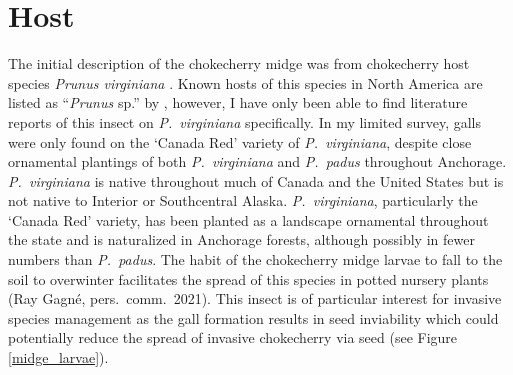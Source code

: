 \section{Host}
 The initial description of the chokecherry midge was from chokecherry host species \textit{Prunus virginiana} \citep{Felt1906}. Known hosts of this species in North America are listed as ``\textit{Prunus} sp.'' by \citet{GagneJaschhof2021}, however, I have only been able to find literature reports of this insect on \textit{P.\ virginiana} specifically. In my limited survey, galls were only found on the `Canada Red' variety of \textit{P.\ virginiana}, despite close ornamental plantings of both \textit{P.\ virginiana} and \textit{P.\ padus} throughout Anchorage. \textit{P.\ virginiana} is native throughout much of Canada and the United States but is not native to Interior or Southcentral Alaska. \textit{P.\ virginiana}, particularly the `Canada Red' variety, has been planted as a landscape ornamental throughout the state and is naturalized in Anchorage forests, although possibly in fewer numbers than \textit{P.\ padus}. The habit of the chokecherry midge larvae to fall to the soil to overwinter facilitates the spread of this species in potted nursery plants (Ray Gagn\'{e}, pers.\ comm.\ 2021). This insect is of particular interest for invasive species management as the gall formation results in seed inviability which could potentially reduce the spread of invasive chokecherry via seed (see Figure \ref{midge_larvae}).

